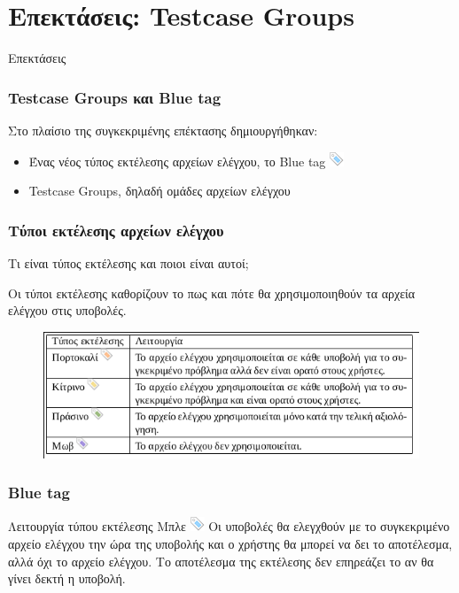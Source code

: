 \documentclass{beamer}
\begin{document}
\section{Επεκτάσεις: Testcase Groups}

\begin{frame}
\Huge{\centerline{Επεκτάσεις}}
\end{frame}

\begin{frame}
  \frametitle{Testcase Groups και Blue tag}
  Στο πλαίσιο της συγκεκριμένης επέκτασης δημιουργήθηκαν:
  \begin{itemize}
      \item Ένας νέος τύπος εκτέλεσης αρχείων ελέγχου, το Blue tag \includegraphics[scale=0.8]{../Figures/tag_blue.png}
      \item Testcase Groups, δηλαδή ομάδες αρχείων ελέγχου
  \end{itemize}
\end{frame}

\begin{frame}
  \frametitle{Τύποι εκτέλεσης αρχείων ελέγχου}
  Τι είναι τύπος εκτέλεσης και ποιοι είναι αυτοί;

  \bigskip

  Οι τύποι εκτέλεσης καθορίζουν το πως και πότε θα χρησιμοποιηθούν τα αρχεία ελέγχου
  στις υποβολές.

  \begin{figure}

    \includegraphics[scale=0.6,trim=4 4 4 4,clip]{../Figures/tipoi.png}
  \end{figure}
\end{frame}

\begin{frame}
  \frametitle{Blue tag}
  \begin{block}{Λειτουργία τύπου εκτέλεσης Μπλε \includegraphics[scale=0.8]{../Figures/tag_blue.png}}
    Οι υποβολές θα ελεγχθούν με το συγκεκριμένο αρχείο ελέγχου την ώρα της υποβολής και ο χρήστης θα μπορεί να δει το αποτέλεσμα, αλλά όχι το αρχείο ελέγχου. Το αποτέλεσμα της εκτέλεσης δεν επηρεάζει το αν θα γίνει δεκτή η υποβολή.
  \end{block}
\end{frame}
\end{document}
